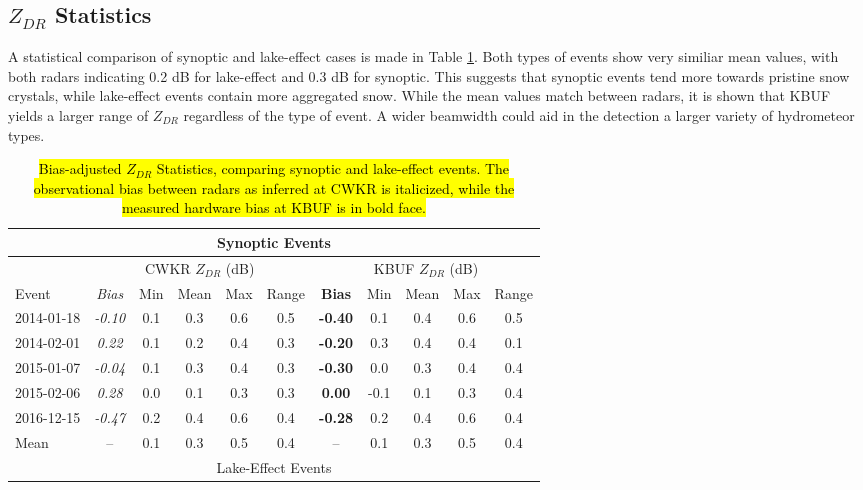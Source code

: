 \subsection{$Z_{DR}$ Statistics}
A statistical comparison of synoptic and lake-effect cases is made in Table \ref{eventcompare}. Both types of events show very similiar mean values, with both radars indicating 0.2 dB for lake-effect and 0.3 dB for synoptic. This suggests that synoptic events tend more towards pristine snow crystals, while lake-effect events contain more aggregated snow. While the mean values match between radars, it is shown that KBUF yields a larger range of $Z_{DR}$ regardless of the type of event. A wider beamwidth could aid in the detection a larger variety of hydrometeor types.
\begin{table}[H]
    \caption{\hl{Bias-adjusted $Z_{DR}$ Statistics, comparing synoptic and lake-effect events. The observational bias between radars as inferred at CWKR is italicized, while the measured hardware bias at KBUF is in bold face.}}\label{eventcompare}
    \begin{center}
    \begin{tabular}{|l|c|c|c|c|c|c|c|c|c|c|}
    \hline 
    \multicolumn{11}{|c|}{Synoptic Events} \\
    \hline
     &
    \multicolumn{5}{|c|}{CWKR $Z_{DR}$ (dB)} & 
    \multicolumn{5}{|c|}{KBUF $Z_{DR}$ (dB)} \\
    \hline 
     Event & \textit{Bias} & Min & Mean & Max & Range & \textbf{Bias} & Min & Mean & Max & Range\\
    \hline\hline
    2014-01-18 & \textit{-0.10} & 0.1 & 0.3 & 0.6 & 0.5 & \textbf{-0.40} & 0.1 & 0.4 & 0.6 & 0.5 \\
    \hline
    2014-02-01 & \textit{0.22} & 0.1 & 0.2 & 0.4 & 0.3 & \textbf{-0.20} & 0.3 & 0.4 & 0.4 & 0.1 \\    
    \hline
    2015-01-07 & \textit{-0.04} & 0.1 & 0.3 & 0.4 & 0.3 & \textbf{-0.30} & 0.0 & 0.3 & 0.4 & 0.4 \\ 
    \hline
    2015-02-06 & \textit{0.28} & 0.0 & 0.1 & 0.3 & 0.3 & \textbf{0.00} & -0.1 & 0.1 & 0.3 & 0.4\\
    \hline
    2016-12-15 & \textit{-0.47} & 0.2 & 0.4 & 0.6 & 0.4 & \textbf{-0.28} & 0.2 & 0.4 & 0.6 & 0.4  \\ 
    \hline 
    Mean  & -- & 0.1 & 0.3 & 0.5 & 0.4 & -- & 0.1 & 0.3 & 0.5 & 0.4 \\
    \hline
    \multicolumn{11}{|c|}{Lake-Effect Events} \\

\end{tabular}
\end{center}
\end{table}
